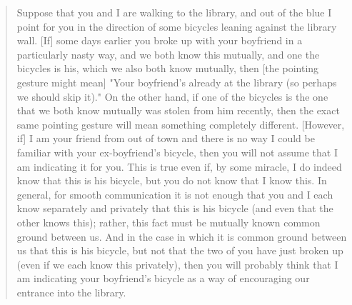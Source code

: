 \documentclass[12pt]{article}
\begin{document}
\begin{quote}
Suppose that you and I are walking to the library, and out of the blue I point for you in the direction of some bicycles leaning against the library wall. [If] some days earlier you broke up with your boyfriend in a particularly nasty way, and we both know this mutually, and one the bicycles is his, which we also both know mutually, then [the pointing gesture might mean] "Your boyfriend's already at the library (so perhaps we should skip it)." On the other hand, if one of the bicycles is the one that we both know mutually was stolen from him recently, then the exact same pointing gesture will mean something completely different. [However, if] I am your friend from out of town and there is no way I could be familiar with your ex-boyfriend's bicycle, then you will not assume that I am indicating it for you. This is true even if, by some miracle, I do indeed know that this is his bicycle, but you do not know that I know this. In general, for smooth communication it is not enough that you and I each know separately and privately that this is his bicycle (and even that the other knows this); rather, this fact must be mutually known common ground between us. And in the case in which it is common ground between us that this is his bicycle, but not that the two of you have just broken up (even if we each know this privately), then you will probably think that I am indicating your boyfriend's bicycle as a way of encouraging our entrance into the library.
\end{quote}
\end{document}
